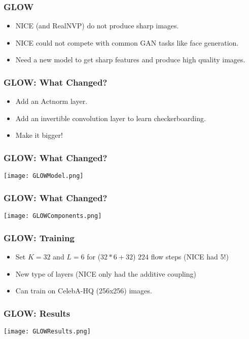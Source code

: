 \begin{frame}
    \frametitle{GLOW}
    \begin{itemize}
        \item NICE (and RealNVP) do not produce sharp images.
        \item NICE could not compete with common GAN tasks like face generation.
        \item Need a new model to get sharp features and produce high quality
            images. 
    \end{itemize}
\end{frame}

\begin{frame}
    \frametitle{GLOW: What Changed?}
    \begin{itemize}
        \item Add an Actnorm layer.
        \item Add an invertible convolution layer to learn checkerboarding.
        \item Make it bigger!
    \end{itemize}
\end{frame}

\begin{frame}
    \frametitle{GLOW: What Changed?}
    \center\texttt{[image: GLOWModel.png]}
\end{frame}

\begin{frame}
    \frametitle{GLOW: What Changed?}
    \center\texttt{[image: GLOWComponents.png]}
\end{frame}

\begin{frame}
    \frametitle{GLOW: Training}
    \begin{itemize}
        \item Set $K=32$ and $L=6$ for ($32*6 + 32$) $224$ flow steps (NICE had
            5!)
        \item New type of layers (NICE only had the additive coupling)
        \item Can train on CelebA-HQ (256x256) images.
    \end{itemize}
\end{frame}

\begin{frame}
    \frametitle{GLOW: Results}
    \center\texttt{[image: GLOWResults.png]}
\end{frame}


